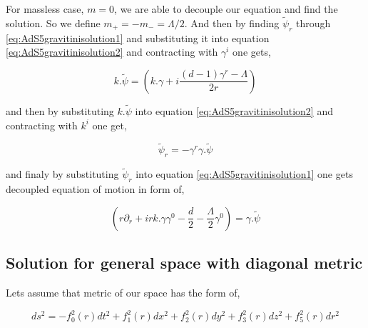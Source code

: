 For massless case, $m = 0$, we are able to decouple our equation and find the solution. So we define $m_+=-m_-=\Lambda/2$. And then by finding $\tilde{\psi}_r$ through \ref{eq:AdS5gravitinisolution1} and substituting it into equation \ref{eq:AdS5gravitinisolution2} and contracting with $\gamma^i$ one gets,

\begin{equation}
   k.\tilde{\psi} = \left( k.\gamma + i\frac{(d-1)\gamma^r - \Lambda}{2r} \right)
\end{equation}

and then by substituting $k.\tilde{\psi}$ into equation \ref{eq:AdS5gravitinisolution2} and contracting with $k^i$ one get,

\begin{equation}
   \tilde{\psi}_r = - \gamma^r \gamma.\tilde{\psi}
\end{equation}

and finaly by substituting $\tilde{\psi}_r$ into equation  \ref{eq:AdS5gravitinisolution1} one gets decoupled equation of motion in form of,

\begin{equation}
   \left(r \partial_r + ir k.\gamma \gamma^0 - \frac{d}{2} -\frac{\Lambda}{2}\gamma^0 \right) = \gamma.\tilde{\psi}
\end{equation}


\subsection{Solution for general space with diagonal metric}

Lets assume that metric of our space has the form of,

\begin{equation}
   ds^2 = -f_0^2(r)dt^2 + f_1^2(r)dx^2 + f_2^2(r)dy^2 + f_3^2(r)dz^2 + f_5^2(r)dr^2
\end{equation}
